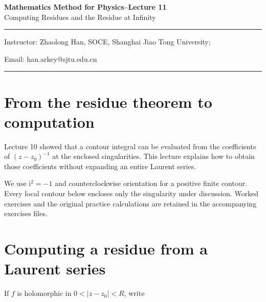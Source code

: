\documentclass[11pt,a4paper]{article}
\theoremstyle{definition}
\theoremstyle{plain}
\begin{document}
\begin{center}
    {\LARGE \textbf{Mathematics Method for Physics--Lecture 11}} \\[0.6em]
    {\large Computing Residues and the Residue at Infinity}
\end{center}

\vspace{-0.5em}
\noindent\rule{\textwidth}{0.5pt}
\vspace{0.3em}

\begin{center}
    Instructor: Zhaolong Han, SOCE, Shanghai Jiao Tong University;
\end{center}

\vspace{-0.6em}
\noindent Email: han.arkey@sjtu.edu.cn

\vspace{0.4em}
\noindent\rule{\textwidth}{0.5pt}

\vspace{0.8em}

\vspace{1.5em}

\section{From the residue theorem to computation}

Lecture 10 showed that a contour integral can be evaluated from the coefficients of $(z-z_0)^{-1}$ at the enclosed singularities. This lecture explains how to obtain those coefficients without expanding an entire Laurent series.

We use $\mathrm{i}^2=-1$ and counterclockwise orientation for a positive finite contour. Every local contour below encloses only the singularity under discussion. Worked exercises and the original practice calculations are retained in the accompanying exercises files.

\section{Computing a residue from a Laurent series}

If $f$ is holomorphic in $0<|z-z_0|<R$, write
\end{document}
